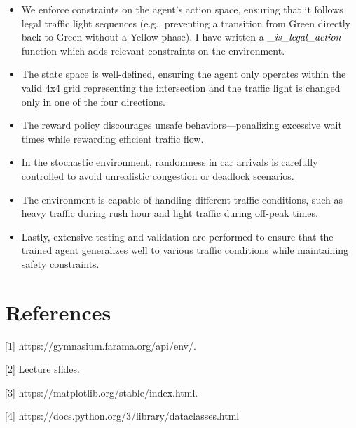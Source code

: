 \documentclass{article}
\begin{document}
\begin{itemize}
    \item We enforce constraints on the agent's action space, ensuring that it follows legal traffic light sequences (e.g., preventing a transition from Green directly back to Green without a Yellow phase). I have written a $\emph{\_is\_legal\_action}$ function which adds relevant constraints on the environment. 
    \item The state space is well-defined, ensuring the agent only operates within the valid 4x4 grid representing the intersection and the traffic light is changed only in one of the four directions. 
    \item The reward policy discourages unsafe behaviors—penalizing excessive wait times while rewarding efficient traffic flow. 
    \item In the stochastic environment, randomness in car arrivals is carefully controlled to avoid unrealistic congestion or deadlock scenarios. 
    \item The environment is capable of handling different traffic conditions, such as heavy traffic during rush hour and light traffic during off-peak times.
    \item Lastly, extensive testing and validation are performed to ensure that the trained agent generalizes well to various traffic conditions while maintaining safety constraints.\\
\end{itemize}


\section*{References}

\small

[1] https://gymnasium.farama.org/api/env/.

[2] Lecture slides.

[3] https://matplotlib.org/stable/index.html.

[4] https://docs.python.org/3/library/dataclasses.html
\end{document}
